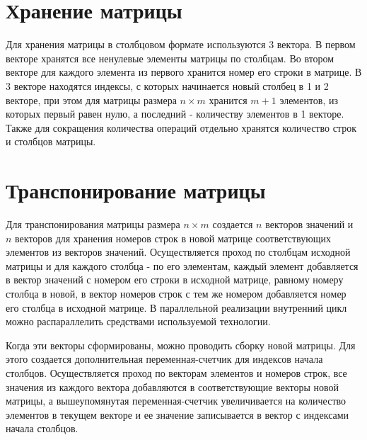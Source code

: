 \documentclass{report}
\begin{document}
\newpage

\section*{Хранение матрицы}
\par Для хранения матрицы в столбцовом формате используются 3 вектора. В первом векторе хранятся все ненулевые элементы матрицы по столбцам. Во втором векторе для каждого элемента из первого хранится номер его строки в матрице. В 3 векторе находятся индексы, с которых начинается новый столбец в 1 и 2 векторе, при этом для матрицы размера \(n×m\) хранится \(m+1\) элементов, из которых первый равен нулю, а последний - количеству элементов в 1 векторе. Также для сокращения количества операций отдельно хранятся количество строк и столбцов матрицы.

\newpage

\section*{Транспонирование матрицы}
\par Для транспонирования матрицы размера \(n×m\) создается \(n\) векторов значений и \(n\) векторов для хранения номеров строк в новой матрице соответствующих элементов из векторов значений. Осуществляется проход по столбцам исходной матрицы и для каждого столбца - по его элементам, каждый элемент добавляется в вектор значений с номером его строки в исходной матрице, равному номеру столбца в новой, в вектор номеров строк с тем же номером добавляется номер его столбца в исходной матрице. В параллельной реализации внутренний цикл можно распараллелить средствами используемой технологии.

\par Когда эти векторы сформированы, можно проводить сборку новой матрицы. Для этого создается дополнительная переменная-счетчик для индексов начала столбцов. Осуществляется проход по векторам элементов и номеров строк, все значения из каждого вектора добавляются в соответствующие векторы новой матрицы, а вышеупомянутая переменная-счетчик увеличивается на количество элементов в текущем векторе и ее значение записывается в вектор с индексами начала столбцов.

\newpage
\end{document}
